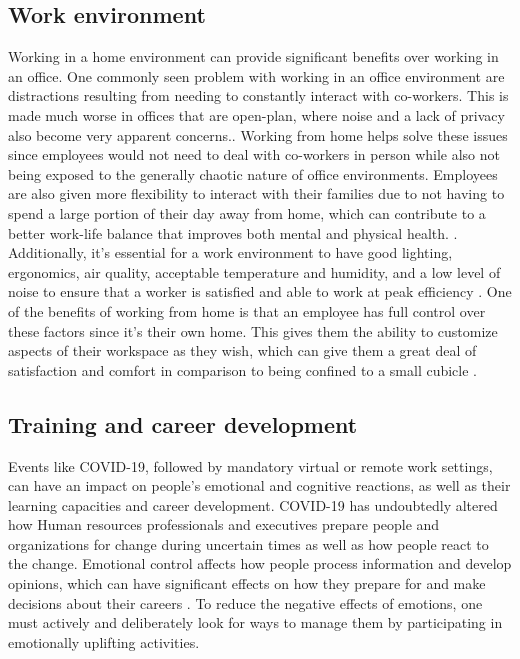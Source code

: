 \documentclass[12pt]{article}
\begin{document}
\subsection*{Work environment}

Working in a home environment can provide significant benefits over working in an office. One commonly seen problem with working in an office environment are distractions resulting from needing to constantly interact with co-workers. This is made much worse in offices that are open-plan, where noise and a lack of privacy also become very apparent concerns.\cite{Kim2013}. Working from home helps solve these issues since employees would not need to deal with co-workers in person while also not being exposed to the generally chaotic nature of office environments. Employees are also given more flexibility to interact with their families due to not having to spend a large portion of their day away from home, which can contribute to a better work-life balance that improves both mental and physical health. \cite{Xiao2021}. Additionally, it’s essential for a work environment to have good lighting, ergonomics, air quality, acceptable temperature and humidity, and a low level of noise to ensure that a worker is satisfied and able to work at peak efficiency \cite{Xiao2021}. One of the benefits of working from home is that an employee has full control over these factors since it’s their own home. This gives them the ability to customize aspects of their workspace as they wish, which can give them a great deal of satisfaction and comfort in comparison to being confined to a small cubicle \cite{Xiao2021}.

\subsection*{Training and career development}

Events like COVID-19, followed by mandatory virtual or remote work settings, can have an impact on people's emotional and cognitive reactions, as well as their learning capacities and career development. COVID-19 has undoubtedly altered how Human resources professionals and executives prepare people and organizations for change during uncertain times as well as how people react to the change. Emotional control affects how people process information and develop opinions, which can have significant effects on how they prepare for and make decisions about their careers \cite{Restubog2020}. To reduce the negative effects of emotions, one must actively and deliberately look for ways to manage them by participating in emotionally uplifting activities.
\end{document}
